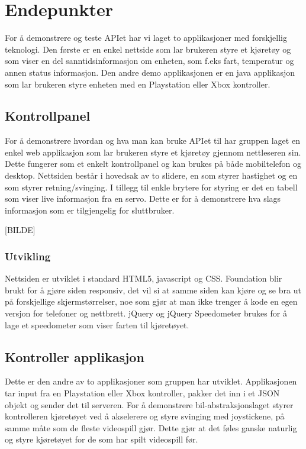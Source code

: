 \documentclass[12pt]{report}
\begin{document}
\chapter{Endepunkter}
For å demonstrere og teste APIet har vi laget to applikasjoner med forskjellig teknologi. Den første er en enkel nettside som lar brukeren styre et kjøretøy og som viser en del sanntidsinformasjon om enheten, som f.eks fart, temperatur og annen status informasjon. Den andre demo applikasjonen er en java applikasjon som lar brukeren styre enheten med en Playstation eller Xbox kontroller.

\section{Kontrollpanel}
For å demonstrere hvordan og hva man kan bruke APIet til har gruppen laget en enkel web applikasjon som lar brukeren styre et kjøretøy gjennom nettleseren sin. Dette fungerer som et enkelt kontrollpanel og kan brukes på både mobiltelefon og desktop. Nettsiden består i hovedsak av to slidere, en som styrer hastighet og en som styrer retning/svinging. I tillegg til enkle brytere for styring er det en tabell som viser live informasjon fra en servo. Dette er for å demonstrere hva slags informasjon som er tilgjengelig for sluttbruker.

[BILDE]

\subsection{Utvikling}
Nettsiden er utviklet i standard HTML5, javascript og CSS. Foundation\cite{Foundation} blir brukt for å gjøre siden responsiv, det vil si at samme siden kan kjøre og se bra ut på forskjellige skjermstørrelser, noe som gjør at man ikke trenger å kode en egen versjon for telefoner og nettbrett. jQuery\cite{jQuery} og jQuery Speedometer\cite{jQuerySpeed} brukes for å lage et speedometer som viser farten til kjøretøyet.

\section{Kontroller applikasjon}
Dette er den andre av to applikasjoner som gruppen har utviklet. Applikasjonen tar input fra en Playstation eller Xbox kontroller, pakker det inn i et JSON objekt og sender det til serveren. For å demonstrere bil-abstraksjonslaget styrer kontrolleren kjøretøyet ved å akselerere og styre svinging med joystickene, på samme måte som de fleste videospill gjør. Dette gjør at det føles ganske naturlig og styre kjøretøyet for de som har spilt videospill før.
\end{document}
